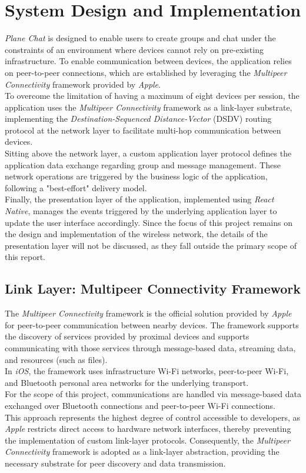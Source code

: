 \documentclass[conference]{IEEEtran}
\begin{document}
\section{System Design and Implementation}
\label{sec:DesignAndImplementation}
\textit{Plane Chat} is designed to enable users to create groups and chat under
the constraints of an environment where devices cannot rely on pre-existing
infrastructure. To enable communication between devices, the application relies
on peer-to-peer connections, which are established by leveraging the
\textit{Multipeer Connectivity} framework provided by \textit{Apple}.\\
To overcome the limitation of having a maximum of eight devices per session, the
application uses the \textit{Multipeer Connectivity} framework as a link-layer
substrate, implementing the \textit{Destination-Sequenced Distance-Vector}
(DSDV) routing protocol at the network layer to facilitate multi-hop
communication between devices.\\ 
Sitting above the network layer, a custom application layer protocol defines
the application data exchange regarding group and message management. These
network operations are triggered by the business logic of the application,
following a "best-effort" delivery model. \\
Finally, the presentation layer of the application, implemented using \textit{React
Native}, manages the events triggered by the underlying application layer to
update the user interface accordingly. Since the focus of this project remains
on the design and implementation of the wireless network, the details of the
presentation layer will not be discussed, as they fall outside the primary scope
of this report. \\ 

\subsection{Link Layer: Multipeer Connectivity Framework}
The \textit{Multipeer Connectivity} framework is the official solution provided
by \textit{Apple} for peer-to-peer communication between nearby devices. The
framework supports the discovery of services provided by proximal devices and
supports communicating with those services through message-based data, streaming
data, and resources (such as files). \\
In \textit{iOS}, the framework uses infrastructure Wi-Fi networks, peer-to-peer
Wi-Fi, and Bluetooth personal area networks for the underlying transport. \\ 
For the scope of this project, communications are handled via message-based data
exchanged over Bluetooth connections and peer-to-peer Wi-Fi connections. \\
This approach represents the highest degree of control accessible to developers,
as \textit{Apple} restricts direct access to hardware network interfaces,
thereby preventing the implementation of custom link-layer protocols.
Consequently, the \textit{Multipeer Connectivity} framework is adopted as a
link-layer abstraction, providing the necessary substrate for peer discovery and
data transmission. \\
\end{document}
